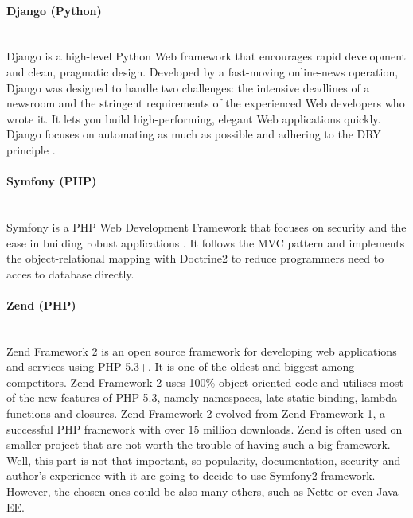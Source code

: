 \documentclass[thesis=B,english]{FITthesis}[2013/04/26]
\newcommand{\myparagraph}[1]{\paragraph{#1}\mbox{}\\}
\begin{document}
\myparagraph{Django (Python)}

Django is a high-level Python Web framework that encourages rapid development and clean, pragmatic design. Developed by a fast-moving online-news operation, Django was designed to handle two challenges: the intensive deadlines of a newsroom and the stringent requirements of the experienced Web developers who wrote it. It lets you build high-performing, elegant Web applications quickly. Django focuses on automating as much as possible and adhering to the DRY principle \cite{django}.


\myparagraph{Symfony (PHP)}

Symfony is a PHP Web Development Framework that focuses on security and the ease in building robust applications \cite{symfony}. It follows the MVC pattern and implements the object-relational mapping with Doctrine2 to reduce programmers need to acces to database directly. 


\myparagraph{Zend (PHP)}

Zend Framework 2 is an open source framework for developing web applications and services using PHP 5.3+. It is one of the oldest and biggest among competitors. Zend Framework 2 uses 100\% object-oriented code and utilises most of the new features of PHP 5.3, namely namespaces, late static binding, lambda functions and closures. Zend Framework 2 evolved from Zend Framework 1, a successful PHP framework with over 15 million downloads. \cite{zend} Zend is often used on smaller project that are not worth the trouble of having such a big framework. \\

Well, this part is not that important, so popularity, documentation, security and author's experience with it are going to decide to use Symfony2 framework. However, the chosen ones could be also many others, such as Nette or even Java EE.
\end{document}
